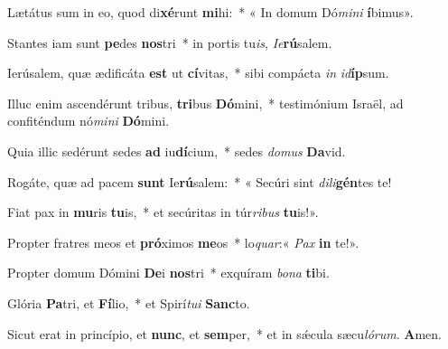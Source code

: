 \item Lætátus sum in eo, quod di\textbf{xé}runt \textbf{mi}hi:~* « In domum Dó\textit{mini} \textbf{í}bimus».

\item Stantes iam sunt \textbf{pe}des \textbf{nos}tri~* in portis tu\textit{is}, \textit{Ie}\textbf{rú}salem.

\item Ierúsalem, quæ ædificáta \textbf{est} ut \textbf{cí}vitas,~* sibi compácta \textit{in} \textit{id}\textbf{íp}sum.

\item Illuc enim ascendérunt tribus, \textbf{tri}bus \textbf{Dó}mini,~* testimónium Israël, ad confiténdum nó\textit{mini} \textbf{Dó}mini.

\item Quia illic sedérunt sedes \textbf{ad} iu\textbf{dí}cium,~* sedes \textit{domus} \textbf{Da}vid.

\item Rogáte, quæ ad pacem \textbf{sunt} Ie\textbf{rú}salem:~* « Secúri sint \textit{dili}\textbf{gén}tes te!

\item Fiat pax in \textbf{mu}ris \textbf{tu}is,~* et secúritas in túr\textit{ribus} \textbf{tu}is!».

\item Propter fratres meos et \textbf{pró}ximos \textbf{me}os~* lo\textit{quar}:« \textit{Pax} \textbf{in} te!».

\item Propter domum Dómini \textbf{De}i \textbf{nos}tri~* exquíram \textit{bona} \textbf{ti}bi.

\item Glória \textbf{Pa}tri, et \textbf{Fí}lio,~* et Spirí\textit{tui} \textbf{Sanc}to.

\item Sicut erat in princípio, et \textbf{nunc}, et \textbf{sem}per,~* et in sǽcula sæcu\textit{lórum}. \textbf{A}men.